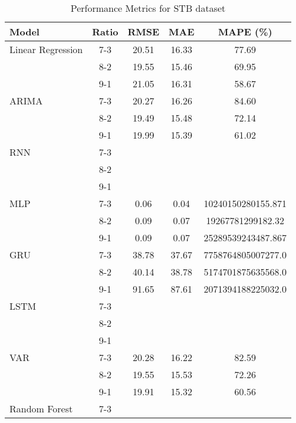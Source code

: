 \begin{table}[h!]
    \centering
    \caption{Performance Metrics for STB dataset}
    \begin{tabular}{|l|c|c|c|c|}
    \hline
    \rowcolor{orange!30} \textbf{Model} & \textbf{Ratio} & \textbf{RMSE} & \textbf{MAE} & \textbf{MAPE (\%)} \\ \hline
    \rowcolor{white} Linear Regression & 7-3 & 20.51 & 16.33 & 77.69 \\ \hline
    \rowcolor{white}  & 8-2 & 19.55 & 15.46 & 69.95 \\ \hline
    \rowcolor{white}  & 9-1 & 21.05 & 16.31 & 58.67 \\ \hline
    \rowcolor{white} ARIMA & 7-3 & 20.27 & 16.26 & 84.60 \\ \hline
    \rowcolor{white}  & 8-2 & 19.49 & 15.48 & 72.14 \\ \hline
    \rowcolor{white}  & 9-1 & 19.99 & 15.39 & 61.02 \\ \hline
    \rowcolor{white} RNN & 7-3 &  &  &  \\ \hline
    \rowcolor{white}  & 8-2 &  &  &  \\ \hline
    \rowcolor{white}  & 9-1 &  &  &  \\ \hline
    \rowcolor{white} MLP & 7-3 & 0.06 & 0.04& 10240150280155.871 \\ \hline
    \rowcolor{white}  & 8-2 & 0.09 & 0.07 & 19267781299182.32 \\ \hline
    \rowcolor{white}  & 9-1 & 0.09 & 0.07& 25289539243487.867  \\ \hline
    \rowcolor{white} GRU & 7-3 & 38.78 & 37.67 & 7758764805007277.0 \\ \hline
    \rowcolor{white}  & 8-2 & 40.14 & 38.78 & 5174701875635568.0 \\ \hline
    \rowcolor{white}  & 9-1 & 91.65 & 87.61 & 2071394188225032.0 \\ \hline
    \rowcolor{white} LSTM & 7-3 &  &  &  \\ \hline
    \rowcolor{white}  & 8-2 &  &  &  \\ \hline
    \rowcolor{white}  & 9-1 &  &  &  \\ \hline
    \rowcolor{white} VAR & 7-3 & 20.28 & 16.22 & 82.59 \\ \hline
    \rowcolor{white}  & 8-2 & 19.55 & 15.53 & 72.26 \\ \hline
    \rowcolor{white}  & 9-1 & 19.91 & 15.32 & 60.56 \\ \hline
    \rowcolor{white} Random Forest & 7-3 &  &  &  \\ \hline

\end{tabular}
\end{table}
